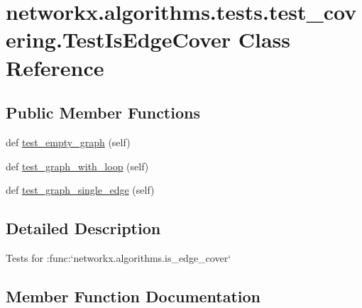 \hypertarget{classnetworkx_1_1algorithms_1_1tests_1_1test__covering_1_1TestIsEdgeCover}{}\section{networkx.\+algorithms.\+tests.\+test\+\_\+covering.\+Test\+Is\+Edge\+Cover Class Reference}
\label{classnetworkx_1_1algorithms_1_1tests_1_1test__covering_1_1TestIsEdgeCover}
\subsection*{Public Member Functions}
\begin{DoxyCompactItemize}
\item 
def \hyperlink{classnetworkx_1_1algorithms_1_1tests_1_1test__covering_1_1TestIsEdgeCover_a7e09e99db0c1a3120e61d32e0c4be9bb}{test\+\_\+empty\+\_\+graph} (self)
\item 
def \hyperlink{classnetworkx_1_1algorithms_1_1tests_1_1test__covering_1_1TestIsEdgeCover_a5dff0f0197f3d83edd62e04bbf88c289}{test\+\_\+graph\+\_\+with\+\_\+loop} (self)
\item 
def \hyperlink{classnetworkx_1_1algorithms_1_1tests_1_1test__covering_1_1TestIsEdgeCover_ac0785c992ceed6b4d2110993a8074d11}{test\+\_\+graph\+\_\+single\+\_\+edge} (self)
\end{DoxyCompactItemize}


\subsection{Detailed Description}
\begin{DoxyVerb}Tests for :func:`networkx.algorithms.is_edge_cover`\end{DoxyVerb}
 

\subsection{Member Function Documentation}
\mbox{\label{classnetworkx_1_1algorithms_1_1tests_1_1test__covering_1_1TestIsEdgeCover_a7e09e99db0c1a3120e61d32e0c4be9bb}} 
